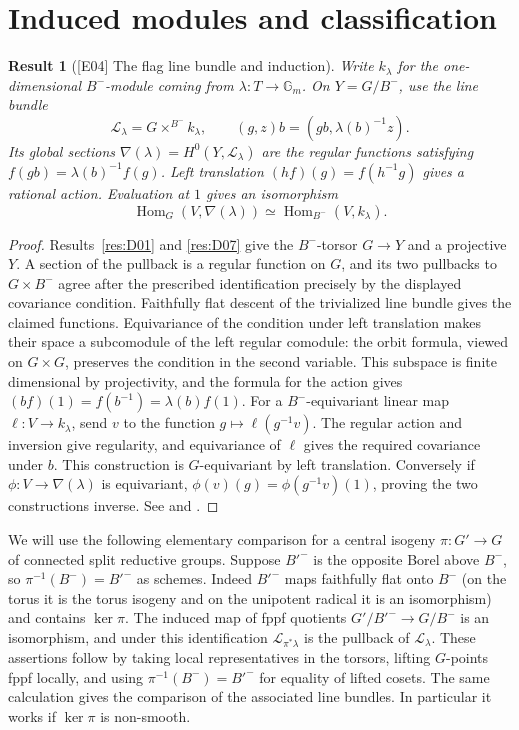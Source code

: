 \documentclass[11pt,a4paper,openany,oneside]{book}
\theoremstyle{resultstyle}
\newtheorem{statement}{Result}[chapter]
\newenvironment{result}[2]{\clubpenalty=10000\begin{statement}[\textnormal{[#1]} #2]\leavevmode\label{res:#1}\ignorespaces}{\end{statement}}
\theoremstyle{definition}
\numberwithin{equation}{chapter}
\begin{document}
\section{Induced modules and classification}

\begin{result}{E04}{The flag line bundle and induction}
Write \(k_\lambda\) for the one-dimensional \(B^-\)-module coming from \(\lambda\colon T\to\mathbb G_m\). On \(Y=G/B^-\), use the line bundle
\[
 \mathcal L_\lambda=G\times^{B^-}k_\lambda,\qquad
 (g,z)b=(gb,\lambda(b)^{-1}z).
\]
Its global sections \(\nabla(\lambda)=H^0(Y,\mathcal L_\lambda)\) are the regular functions satisfying \(f(gb)=\lambda(b)^{-1} f(g)\). Left translation \((h f)(g)=f(h^{-1}g)\) gives a rational action. Evaluation at \(1\) gives an isomorphism
\[
 \operatorname{Hom}_G(V,\nabla(\lambda))
 \simeq \operatorname{Hom}_{B^-}(V,k_\lambda).
\]
\end{result}
\begin{proof}
Results~\ref{res:D01} and \ref{res:D07} give the \(B^-\)-torsor \(G\to Y\) and a projective \(Y\). A section of the pullback is a regular function on \(G\), and its two pullbacks to \(G\times B^-\) agree after the prescribed identification precisely by the displayed covariance condition. Faithfully flat descent of the trivialized line bundle gives the claimed functions. Equivariance of the condition under left translation makes their space a subcomodule of the left regular comodule: the orbit formula, viewed on \(G\times G\), preserves the condition in the second variable. This subspace is finite dimensional by projectivity, and the formula for the action gives \((b f)(1)=f(b^{-1})=\lambda(b)f(1)\). For a \(B^-\)-equivariant linear map \(\ell\colon V\to k_\lambda\), send \(v\) to the function \(g\mapsto\ell(g^{-1}v)\). The regular action and inversion give regularity, and equivariance of \(\ell\) gives the required covariance under \(b\). This construction is \(G\)-equivariant by left translation. Conversely if \(\phi\colon V\to\nabla(\lambda)\) is equivariant, \(\phi(v)(g)=\phi(g^{-1}v)(1)\), proving the two constructions inverse. See \cite[22.21, 22.29--22.30, 22.48]{milne} and \cite[Part~I, Chapter~3]{jantzen}.
\end{proof}

We will use the following elementary comparison for a central isogeny \(\pi\colon G'\to G\) of connected split reductive groups. Suppose \(B'^-\) is the opposite Borel above \(B^-\), so \(\pi^{-1}(B^-)=B'^-\) as schemes. Indeed \(B'^-\) maps faithfully flat onto \(B^-\) (on the torus it is the torus isogeny and on the unipotent radical it is an isomorphism) and contains \(\ker\pi\). The induced map of fppf quotients \(G'/B'^-\to G/B^-\) is an isomorphism, and under this identification \(\mathcal L_{\pi^*\lambda}\) is the pullback of \(\mathcal L_\lambda\). These assertions follow by taking local representatives in the torsors, lifting \(G\)-points fppf locally, and using \(\pi^{-1}(B^-)=B'^-\) for equality of lifted cosets. The same calculation gives the comparison of the associated line bundles. In particular it works if \(\ker\pi\) is non-smooth.
\end{document}
